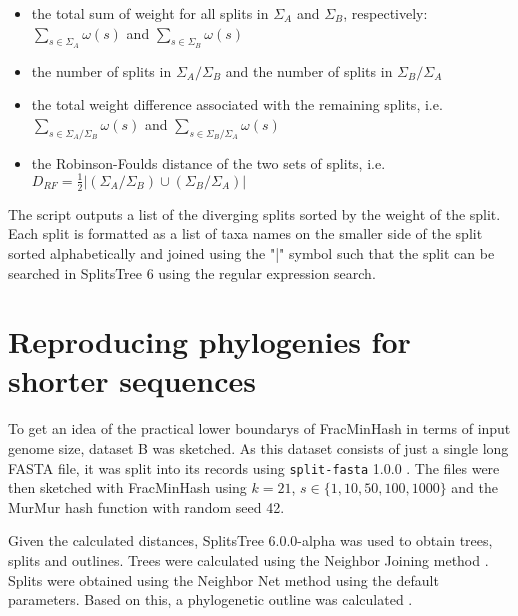 \begin{itemize}
  \item the total sum of weight for all splits in $\Sigma_A$ and $\Sigma_B$,
  respectively: $\sum_{s \in \Sigma_A}{\omega(s)}$ and $\sum_{s \in
  \Sigma_B}{\omega(s)}$ 
  \item the number of splits in $\Sigma_A / \Sigma_B$ and the number of splits
  in $\Sigma_B / \Sigma_A$
  \item the total weight difference associated with the remaining splits, i.e.
  $\sum_{s \in \Sigma_A / \Sigma_B}{\omega(s)}$ and $\sum_{s \in \Sigma_B /
  \Sigma_A}{\omega(s)}$
  \item the Robinson-Foulds distance
  \cite{robinsonComparisonPhylogeneticTrees1981} of the two sets of splits, i.e.
  $D_{RF} = \frac{1}{2}|(\Sigma_A / \Sigma_B) \cup (\Sigma_B / \Sigma_A)|$
\end{itemize}

The script outputs a list of the diverging splits sorted by the weight of the
split. Each split is formatted as a list of taxa names on the smaller side of
the split sorted alphabetically and joined using the "|" symbol such that the
split can be searched in SplitsTree 6 using the regular expression search.



\section{Reproducing phylogenies for shorter sequences}
To get an idea of the practical lower boundarys of FracMinHash in terms of input
genome size, dataset B was sketched. As this dataset consists of just a single
long FASTA file, it was split into its records using \texttt{split-fasta} 1.0.0
. The files were then sketched with FracMinHash using
$k=21$, $s \in \{1, 10, 50, 100, 1000\}$ and the 
MurMur hash function with random seed 42.

Given the calculated distances, SplitsTree 6.0.0-alpha
\cite{husonApplicationPhylogeneticNetworks2006} was used to obtain trees, splits
and outlines. Trees were calculated using the Neighbor Joining method
\cite{saitouNeighborjoiningMethodNew1987}. Splits were obtained using the
Neighbor Net method
\cite{bryantNeighborNetAgglomerativeMethod2004,bryantNeighborNetImprovedAlgorithms2023}
using the default parameters. Based on this, a phylogenetic outline was
calculated \cite{bagciMicrobialPhylogeneticContext2021}.


